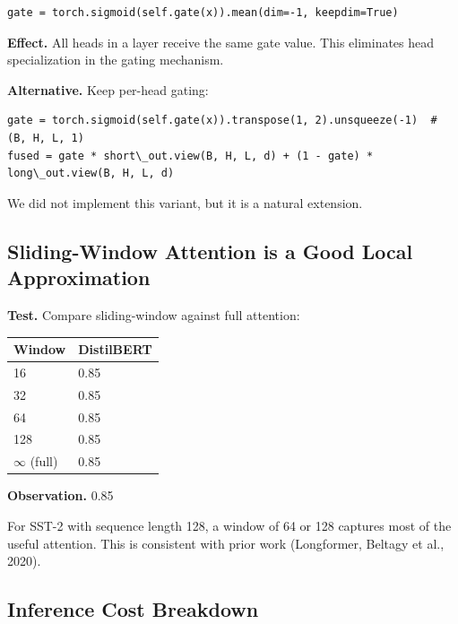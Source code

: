 \begin{lstlisting}
gate = torch.sigmoid(self.gate(x)).mean(dim=-1, keepdim=True)
\end{lstlisting}

\textbf{Effect.} All heads in a layer receive the same gate value. This 
eliminates head specialization in the gating mechanism.

\textbf{Alternative.} Keep per-head gating:

\begin{lstlisting}
gate = torch.sigmoid(self.gate(x)).transpose(1, 2).unsqueeze(-1)  # (B, H, L, 1)
fused = gate * short\_out.view(B, H, L, d) + (1 - gate) * long\_out.view(B, H, L, d)
\end{lstlisting}

We did not implement this variant, but it is a natural extension.

\subsection{Sliding-Window Attention is a Good Local Approximation}

\textbf{Test.} Compare sliding-window against full attention:

\begin{table}[H]
\centering
\small
\begin{tabular}{ll}
\toprule
\textbf{Window} & \textbf{DistilBERT} \\
\midrule
16 & 0.85 \\
32 & 0.85 \\
64 & 0.85 \\
128 & 0.85 \\
$\infty$ (full) & 0.85 \\
\bottomrule
\end{tabular}
\end{table}

\textbf{Observation.} 0.85

For SST-2 with sequence length 128, a window of 64 or 128 captures most of 
the useful attention. This is consistent with prior work (Longformer, 
Beltagy et al., 2020).

\subsection{Inference Cost Breakdown}

